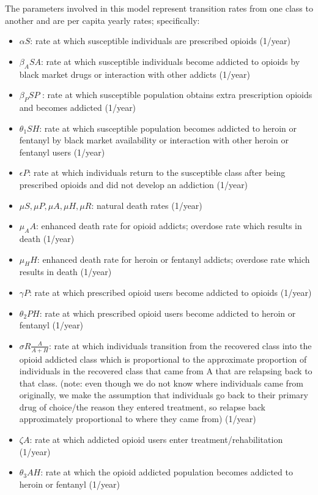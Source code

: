 \documentclass[12pt]{article}
\begin{document}
The parameters involved in this model represent transition rates from one class to another and are per capita yearly rates; specifically: 
\begin{itemize}
\item $\alpha S$: rate at which susceptible individuals are prescribed opioids (1/year)
\item $\beta_{A} SA$: rate at which susceptible individuals become addicted to opioids by black market drugs or interaction with other addicts (1/year)
\item $\beta_{P} SP$ : rate at which susceptible population obtains extra prescription opioids and becomes addicted  (1/year)
\item $\theta_1 SH$: rate at which susceptible population becomes addicted to heroin or fentanyl by black market availability or interaction with other heroin or fentanyl users  (1/year)
\item $\epsilon P$: rate at which individuals return to the susceptible class after being prescribed opioids and did not develop an addiction (1/year) 
\item $\mu S, \mu P, \mu A, \mu H, \mu R$: natural death rates (1/year)
\item $\mu_A A$: enhanced death rate for opioid addicts; overdose rate which results in death (1/year)
\item $\mu_H H$: enhanced death rate for heroin or fentanyl addicts; overdose rate which results in death (1/year)
\item $\gamma P$: rate at which prescribed opioid users become addicted to opioids (1/year)
\item $\theta_2 PH$: rate at which prescribed opioid users become addicted to heroin or fentanyl (1/year)
\item $\sigma R \frac{A}{A+H}$: rate at which individuals transition from the recovered class into the opioid addicted class which is proportional to the approximate proportion of individuals in the recovered class that came from A that are relapsing back to that class. (note: even though we do not know where individuals came from originally, we make the assumption that individuals go back to their primary drug of choice/the reason they entered treatment, so relapse back approximately proportional to where they came from) (1/year)
\item $\zeta A$: rate at which addicted opioid users enter treatment/rehabilitation (1/year)
\item $\theta_3 AH$: rate at which the opioid addicted population becomes addicted to heroin or fentanyl  (1/year)

\end{itemize}
\end{document}
